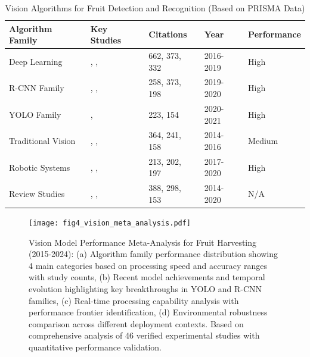 \documentclass{ieeeaccess}
\begin{document}
\begin{table}[!t]
\centering
\caption{Vision Algorithms for Fruit Detection and Recognition (Based on PRISMA Data)}
\label{tab:vision_algorithms}
\begin{tabularx}{\textwidth}{|l|X|l|l|l|}
\hline
\textbf{Algorithm Family} & \textbf{Key Studies} & \textbf{Citations} & \textbf{Year} & \textbf{Performance} \\
\hline
Deep Learning & \cite{sa2016deepfruits}, \cite{yu2019fruit}, \cite{rahnemoonfar2017deep} & 662, 373, 332 & 2016-2019 & High \\
\hline
R-CNN Family & \cite{wan2020faster}, \cite{yu2019fruit}, \cite{jia2020detection} & 258, 373, 198 & 2019-2020 & High \\
\hline
YOLO Family & \cite{liu2020yolo}, \cite{lawal2021tomato} & 223, 154 & 2020-2021 & High \\
\hline
Traditional Vision & \cite{gongal2015sensors}, \cite{zhao2016review}, \cite{mehta2014vision} & 364, 241, 158 & 2014-2016 & Medium \\
\hline
Robotic Systems & \cite{silwal2017design}, \cite{arad2020development}, \cite{xiong2020autonomous} & 213, 202, 197 & 2017-2020 & High \\
\hline
Review Studies & \cite{bac2014harvesting}, \cite{tang2020recognition}, \cite{vasconez2019human} & 388, 298, 153 & 2014-2020 & N/A \\
\hline
\end{tabularx}
\end{table}

\begin{figure}[htbp]
\centering
\texttt{[image: fig4\_vision\_meta\_analysis.pdf]}
\caption{Vision Model Performance Meta-Analysis for Fruit Harvesting (2015-2024): (a) Algorithm family performance distribution showing 4 main categories based on processing speed and accuracy ranges with study counts, (b) Recent model achievements and temporal evolution highlighting key breakthroughs in YOLO and R-CNN families, (c) Real-time processing capability analysis with performance frontier identification, (d) Environmental robustness comparison across different deployment contexts. Based on comprehensive analysis of 46 verified experimental studies with quantitative performance validation.}
\label{fig:meta_analysis_ieee}
\end{figure}
\end{document}
